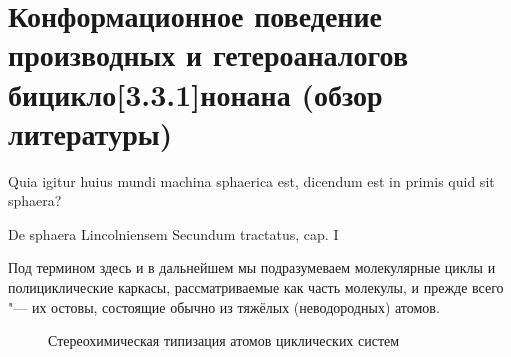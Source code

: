\chapter{Конформационное поведение производных и гетероаналогов бицикло[3.3.1]нонана (обзор литературы)}\label{ch:Review:Basics}

\epigraph{Quia igitur huius mundi machina sphaerica est, dicendum est in primis quid sit sphaera?}{De sphaera Lincolniensem Secundum tractatus, cap. I}

Под термином  здесь и в дальнейшем мы подразумеваем молекулярные циклы и полициклические каркасы, рассматриваемые как часть молекулы, и прежде всего "--- их остовы, состоящие обычно из тяжёлых (неводородных) атомов.

\begin{figure}
\caption{Стереохимическая типизация атомов циклических систем\label{fig:Atom:Types}}

\end{figure}
